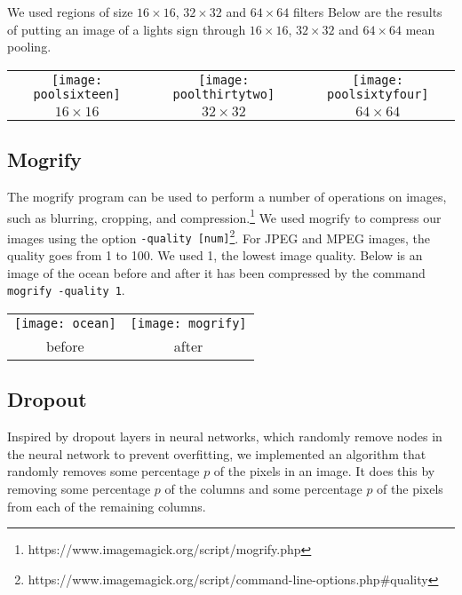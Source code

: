 \documentclass[letterpaper, 10 pt, conference]{ieeeconf}  %
\begin{document}
We used regions of size $16 \times 16$, $32 \times 32$ and $64 \times 64$ filters
Below are the results of putting an image of a lights sign through $16 \times 16$,
$32 \times 32$ and $64 \times 64$ mean pooling.

\vspace*{3mm}
\begin{tabular}{c c c}
	\texttt{[image: poolsixteen]} &
		\texttt{[image: poolthirtytwo]} &
		\texttt{[image: poolsixtyfour]} \\ 
	$16 \times 16$ & $32 \times 32$ & $64 \times 64$ \\
\end{tabular}

\vspace*{3mm}

\subsection{Mogrify}
The mogrify program can be used to perform a number of operations
on images, such as blurring, cropping, and compression.\footnote{https://www.imagemagick.org/script/mogrify.php}
We used mogrify to compress our images using the option {\tt -quality [num]}\footnote{https://www.imagemagick.org/script/command-line-options.php\#quality}.
For JPEG and MPEG images, the quality goes from 1 to 100. We used 1, the lowest image quality.
Below is an image of the ocean before and after it has been compressed by the command
{\tt mogrify -quality 1}.

\vspace*{3mm}
\begin{tabular}{c c}
	\texttt{[image: ocean]} & 
		\texttt{[image: mogrify]} \\
	before & after \\
\end{tabular}
\vspace*{3mm}

\subsection{Dropout}
Inspired by dropout layers in neural networks,
which randomly remove nodes in the neural network
to prevent overfitting, we implemented an algorithm
that randomly removes some percentage $p$ of the pixels 
in an image. It does this by removing
some percentage $p$ of the columns and some percentage $p$ of the pixels
from each of the remaining columns. 
\end{document}
